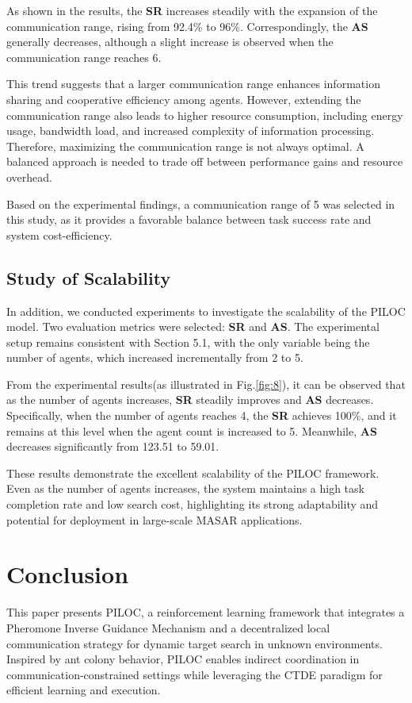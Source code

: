 \documentclass[lettersize,journal]{IEEEtran}
\begin{document}
As shown in the results, the \textbf{SR} increases steadily with the expansion of the communication range, rising from 92.4\% to 96\%. Correspondingly, the \textbf{AS} generally decreases, although a slight increase is observed when the communication range reaches 6.

This trend suggests that a larger communication range enhances information sharing and cooperative efficiency among agents. However, extending the communication range also leads to higher resource consumption, including energy usage, bandwidth load, and increased complexity of information processing. Therefore, maximizing the communication range is not always optimal. A balanced approach is needed to trade off between performance gains and resource overhead.

Based on the experimental findings, a communication range of 5 was selected in this study, as it provides a favorable balance between task success rate and system cost-efficiency.

\subsection{Study of Scalability}
In addition, we conducted experiments to investigate the scalability of the PILOC model. Two evaluation metrics were selected: \textbf{SR} and \textbf{AS}. The experimental setup remains consistent with Section 5.1, with the only variable being the number of agents, which increased incrementally from 2 to 5.

From the experimental results(as illustrated in Fig.\ref{fig:8}), it can be observed that as the number of agents increases,  \textbf{SR} steadily improves and \textbf{AS} decreases. Specifically, when the number of agents reaches 4, the \textbf{SR} achieves 100\%, and it remains at this level when the agent count is increased to 5. Meanwhile, \textbf{AS} decreases significantly from 123.51 to 59.01.

These results demonstrate the excellent scalability of the PILOC framework. Even as the number of agents increases, the system maintains a high task completion rate and low search cost, highlighting its strong adaptability and potential for deployment in large-scale MASAR applications.

\section{Conclusion}
This paper presents PILOC, a reinforcement learning framework that integrates a Pheromone Inverse Guidance Mechanism and a decentralized local communication strategy for dynamic target search in unknown environments. Inspired by ant colony behavior, PILOC enables indirect coordination in communication-constrained settings while leveraging the CTDE paradigm for efficient learning and execution.
\end{document}
